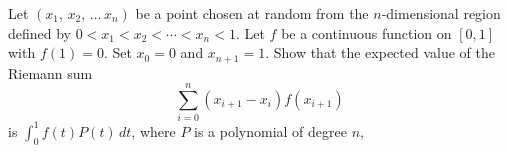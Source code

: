 Let $(x_1,\,x_2,\,\ldots\,x_n)$ be a point chosen at random from the
$n$-dimensional region defined by
$0<x_1<x_2<\cdots < x_n<1.$  Let $f$ be a continuous function on
$[0,1]$ with $f(1)=0$.
Set $x_0=0$ and $x_{n+1}=1$. Show that the expected value of the
Riemann sum
\[
\sum_{i=0}^n (x_{i+1}-x_i) f(x_{i+1})
\]
is $\int_0^1 f(t)P(t)\, dt$, where $P$ is a polynomial of degree $n$,

